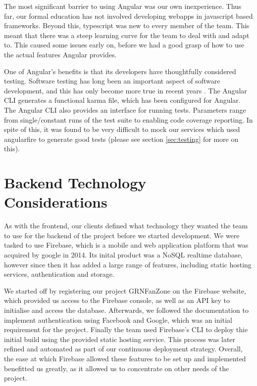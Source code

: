 \documentclass{l3proj}
\begin{document}
The most significant barrier to using Angular was our own inexperience. 
 Thus far, our formal education has not involved developing webapps in
 javascript based frameworks. Beyond this, typescript was new to every
 member of the team. This meant that there was a steep learning curve for
 the team to deal with and adapt to. This caused some issues early on, 
 before we had a good grasp of how to use the actual features Angular
 provides.
 
One of Angular's benefits is that its developers have thoughtfully
 considered testing. Software testing has long been an important
 aspect of software development, and this has only become more true
 in recent years \cite{tuteja2012testing}. The Angular CLI generates
 a functional karma file, which has been configured for Angular. The
 Angular CLI also provides an interface for running tests. Parameters 
 range from single/constant runs of the test suite to enabling code
 coverage reporting. In spite of this, it was found to be very 
 difficult to mock our services which used angularfire to generate
 good tests (please see section \ref{sec:testing} for more on this).
 



\section{Backend Technology Considerations}
\label{sec:backend}



As with the frontend, our clients defined what technology they wanted the team to use for the backend of the project before we started development.
We were tasked to use Firebase, which is a mobile and web application platform that was acquired by google in 2014.
Its inital product was a NoSQL realtime database, however since then it has added a large range of features, including static hosting services, authentication and storage.

We started off by registering our project GRNFanZone on the Firebase website, which provided us access to the Firebase console, as well as an API key to initialise and access the database.
Afterwards, we followed the documentation to implement authentication using Facebook and Google, which was an initial requirement for the project.
Finally the team used Firebase's CLI to deploy thie initial build using the provided static hosting service. This process was later refined and automated as part of our continuous deployment strategy.
Overall, the ease at which Firebase allowed these features to be set up and implemented benefitted us greatly, as it allowed us to concentrate on other needs of the project.
\end{document}
